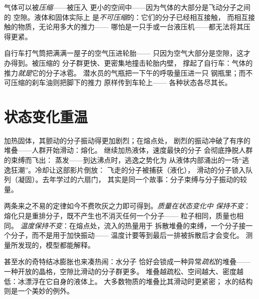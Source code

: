 \begin{proposition}\label{prop:g7:states-of-matter:squeeze}
气体可以被\emph{压缩}——被压入
更小的空间中——因为气体的大部分是飞动分子之间的
空隙。液体和固体实际上
是\emph{不可压缩}的：它们的分子已经相互接触，
而相互接触的物质，无论用多大的推力——
哪怕是一只手或一台液压机——都无法将其压得更紧。
\end{proposition}

\begin{example}[被压缩的空气大显身手]\label{ex:g7:states-of-matter:squeezed}
自行车打气筒把满满一屋子的空气压进轮胎——
只因为空气大部分是空隙，这才办得到。被压缩的
分子群更快、更密集地撞击轮胎内壁，
撑起了自行车：气体的推力\emph{就是}它的分子冰雹。
潜水员的气瓶把一下午的呼吸量压进一只
钢瓶里；而不可压缩的刹车油则把脚下的推力
原样传到车轮上——
各种状态各尽其长。
\end{example}

\section{状态变化重温}

\begin{example}\label{ex:g7:states-of-matter:doors}
加热固体，其颤动的分子振动得更加剧烈；在熔点处，
剧烈的振动冲破了有序的堆叠——人群开始滑动：熔化。
继续加热液体，速度最快的分子
会彻底挣脱人群的束缚而飞出：
蒸发——到达沸点时，逃逸之势化为
从液体内部涌出的一场“逃逸狂潮”。冷却让这部影片倒放：
飞走的分子被捕获（液化），
滑动的分子锁入队列（凝固）。去年学过的六扇门，
其实是同一个故事：分子束缚与分子振动的较量。
\end{example}

\begin{example}\label{ex:g7:states-of-matter:free}
两条来之不易的定律如今不费吹灰之力即可得到。\emph{质量在状态变化中
保持不变}：熔化只是重排分子，既不产生也不消灭任何一个分子——
粒子相同，质量也相同。
\emph{温度保持不变}：在熔点处，流入的热量用于
拆散堆叠的束缚，一个分子接一个分子，而不是用于加快振动——
温度计要等到最后一排被拆散后才会变化。
测量所发现的，模型都能解释。
\end{example}

\begin{remark}[水的反常膨胀]\label{rem:g7:states-of-matter:iceswell}
甚至水的奇特结冰膨胀也来凑热闹：水分子
恰好会锁成一种异常\emph{疏松}的堆叠——
一种开放的晶格，空隙比滑动的分子群更多。
堆叠越疏松、空间越大、密度越低：冰漂浮在它自身的液体上。
大多数物质的堆叠比其滑动时更紧密；
水的结构则是一个美妙的例外。
\end{remark}

